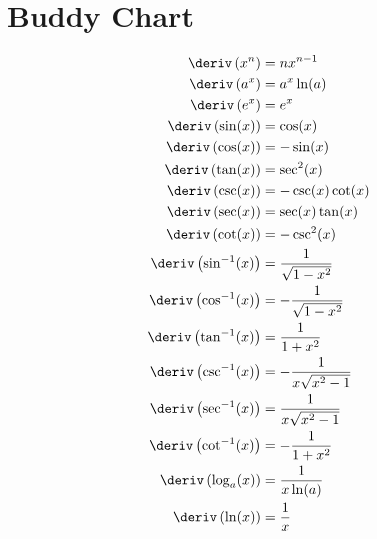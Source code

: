
\chapter{Buddy Chart}
\begin{align*}
  \deriv\left(x^n\right) &= nx^{n-1}\\
  \deriv\left(a^x\right) &= a^x\ln(a) \\
  \deriv\left(e^x\right) &= e^x \\
  \deriv\left(\sin(x)\right) &= \cos(x) \\
  \deriv\left(\cos(x)\right) &= -\sin(x) \\
  \deriv\left(\tan(x)\right) &= \sec^2(x) \\
  \deriv\left(\csc(x)\right) &= -\csc(x)\cot(x) \\
  \deriv\left(\sec(x)\right) &= \sec(x)\tan(x) \\
  \deriv\left(\cot(x)\right) &= -\csc^2(x) \\
  \deriv\left(\sin^{-1}(x)\right) &= \dfrac{1}{\sqrt{1 - x^2}} \\
  \deriv\left(\cos^{-1}(x)\right) &= -\dfrac{1}{\sqrt{1 - x^2}} \\
  \deriv\left(\tan^{-1}(x)\right) &= \dfrac{1}{1 + x^2} \\
  \deriv\left(\csc^{-1}(x)\right) &= -\dfrac{1}{x\sqrt{x^2-1}} \\
  \deriv\left(\sec^{-1}(x)\right) &= \dfrac{1}{x\sqrt{x^2-1}} \\
  \deriv\left(\cot^{-1}(x)\right) &= -\dfrac{1}{1 + x^2} \\
  \deriv\left(\log_a(x)\right) &= \dfrac{1}{x\ln(a)} \\
  \deriv\left(\ln(x)\right) &= \dfrac{1}{x}
\end{align*}

